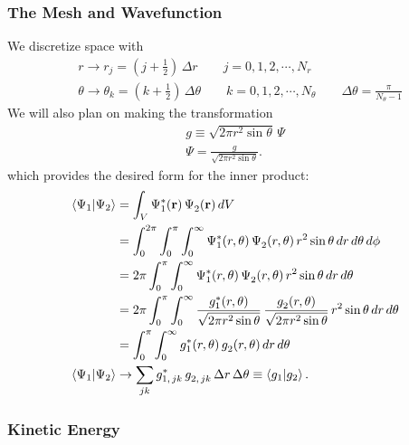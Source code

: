 \documentclass[12pt]{article}
\newcommand{\R}{\mathbf{r}}
\numberwithin{equation}{section}
\begin{document}
\subsubsection{The Mesh and Wavefunction}\label{sec:spherical_mesh}

We discretize space with
\begin{align}
&r \rightarrow r_j = \left(j + \frac{1}{2}\right) \, \Delta r \qquad j = 0, 1, 2, \cdots, N_{r} \nonumber \\
&\theta \rightarrow \theta_k = \left(k + \frac{1}{2}\right) \, \Delta \theta \qquad k = 0, 1, 2, \cdots, N_{\theta} \qquad \Delta\theta = \frac{\pi}{N_{\theta} - 1} \nonumber
\end{align}
We will also plan on making the transformation
\begin{align}\label{eqn:g_spherical}
g \equiv \sqrt{2 \pi r^2 \sin{\theta}} \, \Psi \nonumber \\
\Psi = \frac{g}{\sqrt{2 \pi r^2 \sin{\theta}}}.
\end{align}
which provides the desired form for the inner product:
\begin{align*}
\braket{\Psi_1}{\Psi_2} &= \int_V \Psi^*_1(\R) \, \Psi^{}_2(\R) \, dV \\
&= \int_{0}^{2\pi} \int_{0}^{\pi} \int_{0}^{\infty} \Psi^*_1(r, \theta) \, \Psi^{}_2(r, \theta) \, r^2 \sin{\theta} \, dr \, d\theta \, d\phi \\
&= 2\pi \int_{0}^{\pi} \int_{0}^{\infty} \Psi^*_1(r, \theta) \, \Psi^{}_2(r, \theta) \, r^2 \sin{\theta} \, dr \, d\theta \\
&= 2\pi \int_{0}^{\pi} \int_{0}^{\infty} \frac{g^*_1(r, \theta)}{\sqrt{2 \pi r^2 \sin{\theta}}} \, \frac{g^{}_2(r, \theta)}{\sqrt{2 \pi r^2 \sin{\theta}}} \, r^2 \sin{\theta} \, dr \, d\theta \\
&= \int_{0}^{\pi} \int_{0}^{\infty} g^*_1(r, \theta) \, g^{}_2(r, \theta) \, dr \, d\theta \\
\braket{\Psi_1}{\Psi_2} &\rightarrow \sum_{jk} g^*_{1, \, jk} \, g^{}_{2, \, jk} \, \Delta r \, \Delta \theta \equiv \braket{g_1}{g_2}.
\end{align*}

\subsubsection{Kinetic Energy}\label{sec:spherical_kinetic_energy}
\end{document}
